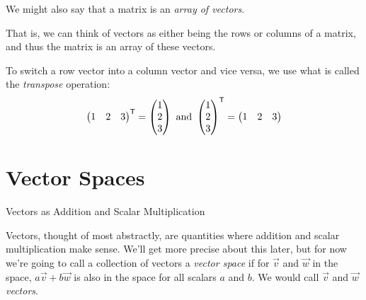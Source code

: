 \documentclass{ximera}
\begin{document}
\begin{definition}\label{def:matrixasarray}

    We might also say that a matrix is an \emph{array of vectors}. 
    
    That is, we can think of vectors as either being the rows or columns of a matrix, and thus the matrix is an array of these vectors.

\end{definition}


\begin{definition}\label{def:transpose}
    To switch a row vector into a column vector and vice versa, we use what is called the \emph{transpose} operation:
    \[
    \begin{pmatrix} 1 &  2 & 3 \end{pmatrix}^{\mathsf{T}} =
    \begin{pmatrix} 1 \\ 2 \\ 3 \end{pmatrix}
    \text{ }\text{and}\text{ }
    \begin{pmatrix} 1 \\ 2 \\ 3 \end{pmatrix}^{\mathsf{T}} =
    \begin{pmatrix} 1 &  2 & 3 \end{pmatrix}
    \]
\end{definition}

\section{Vector Spaces}

\begin{definition}{Vectors as Addition and Scalar Multiplication}%

    Vectors, thought of most abstractly, are quantities where addition and scalar multiplication make sense. We'll get more precise about this later, but for now we're going to call a collection of vectors a \textit{vector space} if for $\vec{v}$ and $\vec{w}$ in the space, $a\vec{v}+b\vec{w}$ is also in the space for all scalars $a$ and $b$. We would call $\vec{v}$ and $\vec{w}$ \textit{vectors}.

\end{definition}
\end{document}
